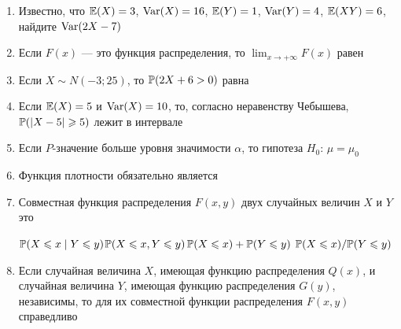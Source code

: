 \documentclass[pdftex,12pt,a4paper]{article}
\begin{document}
\begin{enumerate}


\item Известно, что $\E(X)=3$, $\Var(X)=16$, $\E(Y)=1$, $\Var(Y)=4$, $\E(XY)=6$, найдите $\Var(2X-7)$


\item Если $F(x)$ --- это функция распределения, то $\lim_{x\to +\infty}F(x)$ равен


\item Если $X\sim N(-3;25)$, то $\P(2X+6>0)$ равна


\item Если $\E(X)=5$ и $\Var(X)=10$, то, согласно неравенству Чебышева, $\P(|X-5|\geq 5)$ лежит в интервале

\otvet{$[0;1]$}{$[0;0.4]$}{$[0.4;1]$}{$[0;0.6]$}{$[0.6;1]$}


\item Если $P$-значение больше уровня значимости $\alpha$, то гипотеза $H_0$: $\mu=\mu_0$


\item Функция плотности обязательно является 


\item Совместная функция распределения $F(x,y)$ двух случайных величин $X$ и $Y$ это

{$\P(X\leq x\mid Y\leq y)$}{$\P(X\leq x,Y\leq y)$}{$\P(X\leq x)+\P(Y\leq y)$}
{$\P(X\leq x)/ \P(Y\leq y)$}


\item Если случайная величина $X$, имеющая функцию распределения $Q(x)$, и случайная величина $Y$, имеющая функцию распределения $G(y)$, независимы, то для их совместной функции распределения  $F(x,y)$ справедливо


\end{enumerate}
\end{document}
